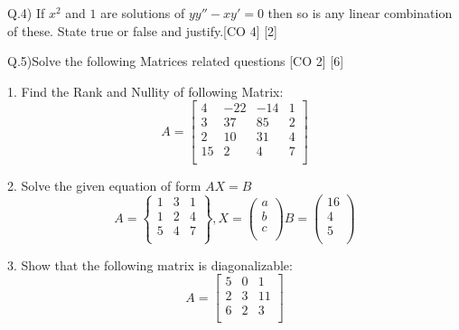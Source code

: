 \documentclass{article}
\begin{document}
\begin{flushleft}
Q.4) If $x^2$ and $1$ are solutions of $yy''-xy'=0$ then so is any linear combination of these. State true or false and justify.\hspace{2cm}[CO 4] [2]
\end{flushleft}
\begin{flushleft}

Q.5)Solve the following Matrices related questions \hspace{2.1cm} [CO 2] [6]
\item 1. Find the Rank and Nullity of following Matrix:
\[
A=
\begin{bmatrix}
4 & -22 & -14 & 1\\
3 & 37  & 85 & 2\\
2 & 10 &  31 & 4\\
15 & 2 &  4 & 7\\
\end{bmatrix}
\]

\item 
\item 2. Solve the given equation of form $AX=B$
\[
A=
\begin{Bmatrix}
1 & 3 & 1\\
1 & 2 & 4\\
5 & 4 & 7\\
\end{Bmatrix}
,
X=
\begin{pmatrix}
a\\
b\\
c\\
\end{pmatrix}
B=
\begin{pmatrix}
16\\
4\\
5\\
\end{pmatrix}
\]


\item 3. Show that the following matrix is diagonalizable:
\[
A=
\begin{bmatrix}
5 & 0 & 1\\
2 & 3  & 11\\
6 & 2 & 3\\
\end{bmatrix}
\]
\end{flushleft}
\end{document}
